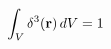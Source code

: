 \documentclass[preview]{standalone}
\begin{document}
\begin{align*}
\special{dvisvgm:raw <g id='unique000'>}\int_V\delta^3(\mathbf r)\,dV=1\special{dvisvgm:raw </g>}
\end{align*}
\end{document}
